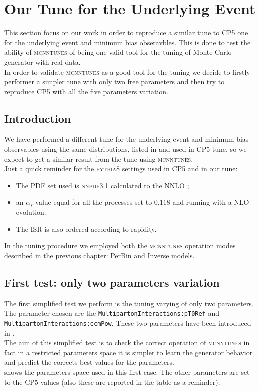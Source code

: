 \chapter{Our Tune for the Underlying Event}
\label{chap:OurTunefortheUnderlyingEvent}

This section focus on our work in order to reproduce a similar tune to CP5 one for the underlying event and minimum bias obseravbles. This is done to test the ability of \textsc{mcnntunes} of being one valid tool for the tuning of Monte Carlo generator with real data. 
\\
In order to validate \textsc{mcnntunes} as a good tool for the tuning we decide to firstly performer a simpler tune with only two free parameters and then try to reproduce CP5 \cite{CPtunes} with all the five parameters variation.


\section{Introduction}

We have performed a different tune for the underlying event and minimum bias observables using the same distributions, listed in  and used in CP5 tune, so we expect to get a similar result from the tune using  \textsc{mcnntunes}.
\\
Just a quick reminder for the \textsc{pythia8} settings used in CP5 and in our tune:
\begin{itemize}
	\item The PDF set used is \textsc{nnpdf}3.1 calculated to the NNLO \cite{NNPDF:2017mvq}; 
	\item an $\alpha_s$ value equal for all the processes set to $0.118$ and running with a NLO evolution.
	\item The ISR is also ordered according to rapidity.
\end{itemize}
In the tuning procedure we employed both the \textsc{mcnntunes} operation modes described in the previous chapter: PerBin and Inverse models.

\section{First test: only two parameters variation}

The first simplified test we perform is the tuning varying of only two parameters. The parameter chosen are the \texttt{MultipartonInteractions:pT0Ref} and 
\\ 
\texttt{MultipartonInteractions:ecmPow}. These two parameters have been introduced in .
\\
The aim of this simplified test is to check the correct operation of \textsc{mcnntunes} in fact in a restricted parameters space it is simpler to learn the generator behavior and predict the corrects best values for the parameters. 
\\
 shows the parameters space used in this first case. The other parameters are set to the CP5 values (also these are reported in the table as a reminder).

